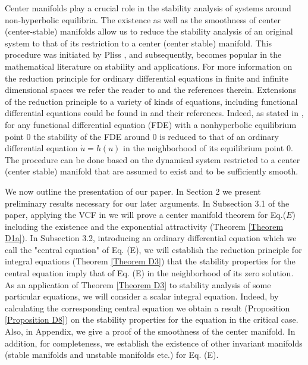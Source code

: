 \documentclass[12pt]{amsart}
\begin{document}
\medskip
Center manifolds play a crucial role in the stability analysis of 
systems around non-hyperbolic equilibria. The existence as well as the smoothness of center (center-stable) manifolds allow us to reduce the stability analysis of an original system to that of its restriction to a center (center stable) manifold. This procedure was initiated by Pliss \cite{pli}, and subsequently, becomes popular in the mathematical literature on stability and applications.  For more information on the reduction principle for ordinary differential equations in finite and infinite dimensional spaces we refer the reader to \cite{aulmin,carr,chilat,hen,malsel,minwu} and the references therein. Extensions of the reduction principle to a variety of kinds of equations, including functional differential equations could be found in \cite{aulmin,farhuawu,hallun,magrua,malsel,minwu,wu} and their references. Indeed, as stated in 
\cite[Section 10.5]{hallun}, for any functional 
differential equation (FDE) with a nonhyperbolic equilibrium point $0$ the stability of the FDE around $0$ is reduced to that of an ordinary differential equation $\dot{u}=h(u)$ 
in the neighborhood of its equilibrium point $0$. The procedure can be done based on the dynamical system restricted to a center (center stable) manifold that are assumed to exist and to be sufficiently smooth.

\medskip
We now outline the presentation of our paper.
In Section 2 we present preliminary results necessary for our 
later arguments. In Subsection 3.1 of the paper, applying the VCF in \cite{mur} 
we will prove a center manifold theorem for Eq.($E$) including the 
existence and the exponential attractivity (Theorem \ref{Theorem D1a}). 
In Subsection 3.2, introducing an 
ordinary differential equation which we call the "central equation" 
of Eq. (E), we will establish the reduction principle for integral equations (Theorem \ref{Theorem D3}) that the 
stability properties for the central equation imply that of Eq. (E) in the neighborhood of its zero solution. 
As an application of Theorem \ref{Theorem D3}  to 
stability analysis of some particular equations, we will consider 
a scalar integral equation. Indeed, by calculating the 
corresponding central equation we obtain a result 
(Proposition \ref{Proposition D8}) on the stability properties 
for the equation in the critical case. Also, in Appendix, we give a proof of the 
smoothness of the center manifold. In addition, for completeness, 
we establish the existence of other invariant manifolds (stable 
manifolds and unstable manifolds etc.) for Eq. (E). 
\end{document}
